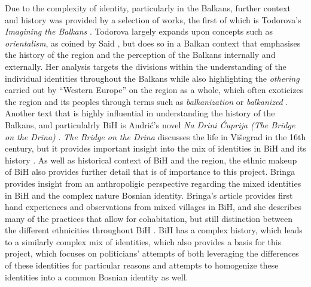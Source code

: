 Due to the complexity of identity, particularly in the Balkans, further context and history was provided by a selection of works, the first of which is Todorova's \textit{Imagining the Balkans} \parencite*{todorova2009}. Todorova \parencite*[][p. 18-19; 38-41]{todorova2009} largely expands upon concepts such as \textit{orientalism}, as coined by Said \parencite*{said1979}, but does so in a Balkan context that emphasises the history of the region and the perception of the Balkans internally and externally. Her analysis targets the divisions within the understanding of the individual identities throughout the Balkans while also highlighting the \textit{othering} carried out by ``Western Europe'' on the region as a whole, which often exoticizes the region and its peoples through terms such as \textit{balkanization} or \textit{balkanized} \Parencite[][p. 33-35; 39-41]{todorova2009}. Another text that is highly influential in understanding the history of the Balkans, and particulalrly BiH is Andrić's novel \textit{Na Drini Ćuprija (The Bridge on the Drina)} \parencite*{andric1977}. \textit{The Bridge on the Drina} discusses the life in Višegrad in the 16th century, but it provides important insight into the mix of identities in BiH and its history \parencite*{andric1977}. As well as historical context of BiH and the region, the ethnic makeup of BiH also provides further detail that is of importance to this project. Bringa \parencite*{Bringa_2000} provides insight from an anthropoligic perspective regarding the mixed identities in BiH and the complex nature Bosnian identity. Bringa's article provides first hand experiences and observations from mixed villages in BiH, and she describes many of the practices that allow for cohabitation, but still distinction between the different ethnicities throughout BiH \Parencite[][p. 82-84]{Bringa_2000}. BiH has a complex history, which leads to a similarly complex mix of identities, which also provides a basis for this project, which focuses on politicians' attempts of both leveraging the differences of these identities for particular reasons and attempts to homogenize these identities into a common Bosnian identity as well.

